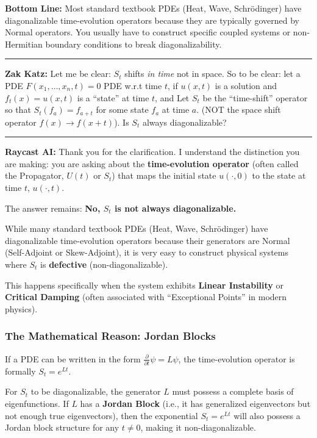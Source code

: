 \documentclass[oneside]{book}
\begin{document}
\textbf{Bottom Line:} Most standard textbook PDEs (Heat, Wave, Schrödinger) have diagonalizable time-evolution operators because they are typically governed by Normal operators. You usually have to construct specific coupled systems or non-Hermitian boundary conditions to break diagonalizability.

\noindent\rule{\textwidth}{0.4pt}

\noindent \textbf{Zak Katz:} Let me be clear: $S_t$ shifts \textit{in time} not in space. So to be clear: let a PDE $F(x_1, \dots, x_n, t)=0$ PDE w.r.t time $t$, if $u(x,t)$ is a solution and $f_t(x) = u(x,t)$ is a ``state'' at time $t$, and Let $S_t$ be the ``time-shift'' operator so that $S_t(f_a) = f_{a+t}$ for some state $f_a$ at time $a$. (NOT the space shift operator $f(x) \to f(x+t)$). Is $S_t$ always diagonalizable?

\noindent\rule{\textwidth}{0.4pt}

\noindent \textbf{Raycast AI:} Thank you for the clarification. I understand the distinction you are making: you are asking about the \textbf{time-evolution operator} (often called the Propagator, $U(t)$ or $S_t$) that maps the initial state $u(\cdot, 0)$ to the state at time $t$, $u(\cdot, t)$.

The answer remains: \textbf{No, $S_t$ is not always diagonalizable.}

While many standard textbook PDEs (Heat, Wave, Schrödinger) have diagonalizable time-evolution operators because their generators are Normal (Self-Adjoint or Skew-Adjoint), it is very easy to construct physical systems where $S_t$ is \textbf{defective} (non-diagonalizable).

This happens specifically when the system exhibits \textbf{Linear Instability} or \textbf{Critical Damping} (often associated with ``Exceptional Points'' in modern physics).

\subsubsection*{The Mathematical Reason: Jordan Blocks}
If a PDE can be written in the form $\frac{\partial}{\partial t} \psi = L \psi$, the time-evolution operator is formally $S_t = e^{Lt}$.

For $S_t$ to be diagonalizable, the generator $L$ must possess a complete basis of eigenfunctions. If $L$ has a \textbf{Jordan Block} (i.e., it has generalized eigenvectors but not enough true eigenvectors), then the exponential $S_t = e^{Lt}$ will also possess a Jordan block structure for any $t \neq 0$, making it non-diagonalizable.
\end{document}
